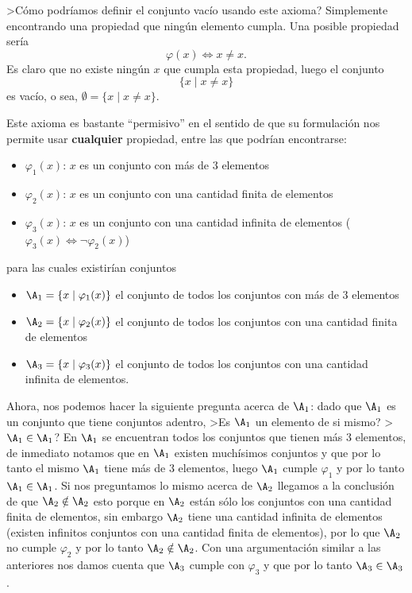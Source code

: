 \begin{ejemplo}
>Cómo podríamos definir el conjunto vacío usando este axioma?
Simplemente encontrando una propiedad  que ningún elemento cumpla.
Una posible propiedad sería
\[
\varphi(x)\Leftrightarrow x\not=x.
\]
Es claro que no existe ningún $x$ que cumpla esta propiedad, luego el conjunto
\[
\{x\;|\;x\not=x\}
\]
es vacío, o sea, $\emptyset=\{x\;|\;x\not=x\}$.
\end{ejemplo}
Este axioma es bastante ``permisivo'' en el sentido de que su formulación nos permite usar {\bf cualquier} propiedad, entre las que podrían encontrarse:
\begin{itemize}
	\vspace*{-\topsep}
	\itemsep 0pt
	\item[] $\varphi_1(x)$: $x$ es un conjunto con más de $3$ elementos
	\item[] $\varphi_2(x)$: $x$ es un conjunto con una cantidad finita de elementos
	\item[] $\varphi_3(x)$: $x$ es un conjunto con una cantidad infinita de elementos ($\varphi_3(x)\Leftrightarrow\neg\varphi_2(x)$)
\end{itemize}
para las cuales existirían conjuntos
\begin{itemize}
	\vspace*{-\topsep}
	\itemsep 0pt
	\item[] $\A_1=\{x\;|\;\varphi_1(x)\}$ el conjunto de todos los conjuntos con más de $3$ elementos
	\item[] $\A_2=\{x\;|\;\varphi_2(x)\}$ el conjunto de todos los conjuntos con una cantidad finita de elementos
	\item[] $\A_3=\{x\;|\;\varphi_3(x)\}$ el conjunto de todos los conjuntos con una cantidad infinita de elementos.
\end{itemize}
Ahora, nos podemos hacer la siguiente pregunta acerca de $\A_1$: dado que $\A_1$ es un conjunto que tiene conjuntos adentro, >Es $\A_1$ un elemento de si mismo? >$\A_1\in \A_1$?
En $\A_1$ se encuentran todos los conjuntos que tienen más $3$ elementos, de inmediato notamos que en $\A_1$ existen muchísimos conjuntos y que por lo tanto el mismo $\A_1$ tiene más de $3$ elementos, luego $\A_1$ cumple $\varphi_1$ y por lo tanto $\A_1\in \A_1$.
Si nos preguntamos lo mismo acerca de $\A_2$ llegamos a la conclusión de que $\A_2\notin \A_2$ esto porque en $\A_2$ están sólo los conjuntos con una cantidad finita de elementos, sin embargo $\A_2$ tiene una cantidad infinita de elementos (existen infinitos conjuntos con una cantidad finita de elementos), por lo que $\A_2$ no cumple $\varphi_2$ y por lo tanto $\A_2\notin \A_2$.
Con una argumentación similar a las anteriores nos damos cuenta que $\A_3$ cumple con $\varphi_3$ y que por lo tanto $\A_3\in \A_3$.

